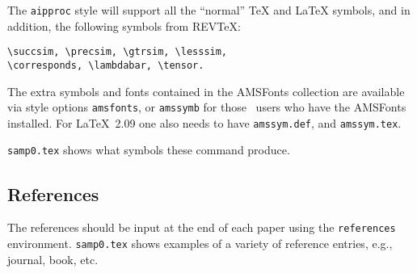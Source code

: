 The \verb+aipproc+ style will support all the ``normal'' \TeX{} and  \LaTeX{}
symbols, and in addition, the following symbols from REV\TeX:
\begin{verbatim}
\succsim, \precsim, \gtrsim, \lesssim, 
\corresponds, \lambdabar, \tensor.
\end{verbatim}
The extra symbols and fonts contained in the
AMSFonts collection are available via style options \verb+amsfonts+, 
or \verb+amssymb+ for those \latexe\ users who have the AMSFonts installed.
For \LaTeX\ 2.09 one also needs to have \verb+amssym.def+, and 
\verb+amssym.tex+.

\verb+samp0.tex+ shows what symbols these command produce.

\subsection{References}


The references should be input at the end of each paper using the
\verb+references+ environment. 
\verb+samp0.tex+ shows examples of a variety of reference
entries, e.g., journal, book, etc.

